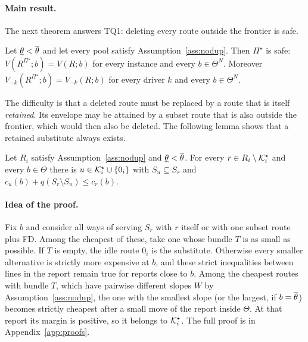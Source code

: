 \paragraph{Main result.} The next theorem answers TQ1: deleting every route
outside the frontier is safe.

\begin{theorem}
\label{thm:frontier}
Let $\underline{\theta}<\overline{\theta}$ and let every pool satisfy Assumption~\ref{ass:nodup}. Then
$\Pi^\star$ is safe: $V(R^{\Pi^\star};b)=V(R;b)$ for every instance and every
$b\in\Theta^N$. Moreover $V_{-k}(R^{\Pi^\star};b)=V_{-k}(R;b)$ for every
driver $k$ and every $b\in\Theta^N$.
\end{theorem}

The difficulty is that a deleted route must be replaced by a route that is
itself \emph{retained}. Its envelope may be attained by a subset route that
is also outside the frontier, which would then also be deleted. The
following lemma shows that a retained substitute always exists.

\begin{lemma}
\label{lem:substitute}
Let $R_i$ satisfy Assumption~\ref{ass:nodup} and $\underline{\theta}<\overline{\theta}$. For every
$r\in R_i\setminus\mathcal{K}^\star_i$ and every $b\in\Theta$ there is
$u\in\mathcal{K}^\star_i\cup\{0_i\}$ with $S_u\subseteq S_r$ and
$c_u(b)+q(S_r\setminus S_u)\le c_r(b)$.
\end{lemma}

\paragraph{Idea of the proof.} Fix $b$ and consider all ways of serving
$S_r$ with $r$ itself or with one subset route plus FD. Among the cheapest of
these, take one whose bundle $T$ is as small as possible. If $T$ is empty,
the idle route $0_i$ is the substitute. Otherwise every smaller alternative is
strictly more expensive at $b$, and these strict inequalities between lines
in the report remain true for reports close to $b$. Among the cheapest routes
with bundle $T$, which have pairwise different slopes $W$ by
Assumption~\ref{ass:nodup}, the one with the smallest slope (or the largest,
if $b=\overline{\theta}$) becomes strictly cheapest after a small move of the report
inside $\Theta$. At that report its margin is positive, so it belongs to
$\mathcal{K}^\star_i$. The full proof is in Appendix~\ref{app:proofs}.

